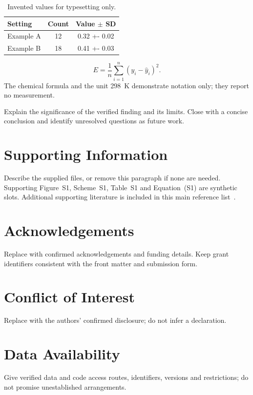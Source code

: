 \documentclass[serif,twocolumn]{prism-wiley-article}
\begin{document}
\begin{table}[htbp]
\centering
\caption{Invented values for typesetting only.}
\label{tab:synthetic}
\begin{tabularx}{\linewidth}{@{}>{\raggedright\arraybackslash}X
 S[table-format=2.0] S[table-format=1.2(2)]@{}}
\toprule
Setting & {Count} & {Value $\pm$ SD}\\
\midrule
Example A & 12 & 0.32 +- 0.02\\
Example B & 18 & 0.41 +- 0.03\\
\bottomrule
\end{tabularx}
\end{table}

\begin{equation}
 E=\frac{1}{n}\sum_{i=1}^{n}(y_i-\widehat y_i)^2.
 \label{eq:metric}
\end{equation}
The chemical formula  and the unit \qty{298}{\kelvin}
demonstrate notation only; they report no measurement.

Explain the significance of the verified finding and its limits. Close
with a concise conclusion and identify unresolved questions as future work.

\section*{Supporting Information}
Describe the supplied files, or remove this paragraph if none are needed.
Supporting Figure~S1, Scheme~S1, Table~S1 and Equation~(S1) are synthetic
slots. Additional supporting literature is included in this main reference
list~\cite{peng2011reproducible}.

\section*{Acknowledgements}
Replace with confirmed acknowledgements and funding details. Keep grant
identifiers consistent with the front matter and submission form.

\section*{Conflict of Interest}
Replace with the authors' confirmed disclosure; do not infer a declaration.

\section*{Data Availability}
Give verified data and code access routes, identifiers, versions and
restrictions; do not promise unestablished arrangements.
\end{document}
